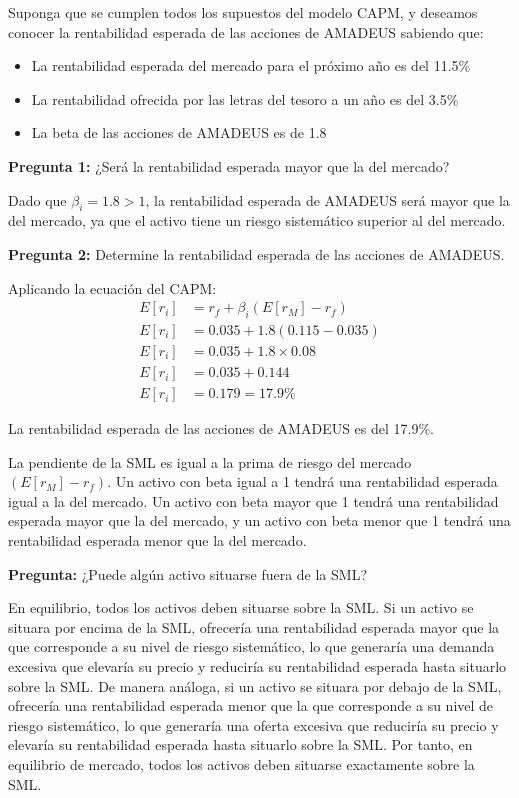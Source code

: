 \begin{ejemplo}
Suponga que se cumplen todos los supuestos del modelo CAPM, y deseamos conocer la rentabilidad esperada de las acciones de AMADEUS sabiendo que:
\begin{itemize}
\item La rentabilidad esperada del mercado para el próximo año es del 11.5\%
\item La rentabilidad ofrecida por las letras del tesoro a un año es del 3.5\%
\item La beta de las acciones de AMADEUS es de 1.8
\end{itemize}

\textbf{Pregunta 1:} ¿Será la rentabilidad esperada mayor que la del mercado?

Dado que $\beta_i = 1.8 > 1$, la rentabilidad esperada de AMADEUS será mayor que la del mercado, ya que el activo tiene un riesgo sistemático superior al del mercado.

\textbf{Pregunta 2:} Determine la rentabilidad esperada de las acciones de AMADEUS.

Aplicando la ecuación del CAPM:
\begin{align}
E[r_i] &= r_f + \beta_i(E[r_M] - r_f) \\
E[r_i] &= 0.035 + 1.8(0.115 - 0.035) \\
E[r_i] &= 0.035 + 1.8 \times 0.08 \\
E[r_i] &= 0.035 + 0.144 \\
E[r_i] &= 0.179 = 17.9\%
\end{align}

La rentabilidad esperada de las acciones de AMADEUS es del 17.9\%.
\end{ejemplo}

La pendiente de la SML es igual a la prima de riesgo del mercado $(E[r_M] - r_f)$. Un activo con beta igual a 1 tendrá una rentabilidad esperada igual a la del mercado. Un activo con beta mayor que 1 tendrá una rentabilidad esperada mayor que la del mercado, y un activo con beta menor que 1 tendrá una rentabilidad esperada menor que la del mercado.

\textbf{Pregunta:} ¿Puede algún activo situarse fuera de la SML?

En equilibrio, todos los activos deben situarse sobre la SML. Si un activo se situara por encima de la SML, ofrecería una rentabilidad esperada mayor que la que corresponde a su nivel de riesgo sistemático, lo que generaría una demanda excesiva que elevaría su precio y reduciría su rentabilidad esperada hasta situarlo sobre la SML. De manera análoga, si un activo se situara por debajo de la SML, ofrecería una rentabilidad esperada menor que la que corresponde a su nivel de riesgo sistemático, lo que generaría una oferta excesiva que reduciría su precio y elevaría su rentabilidad esperada hasta situarlo sobre la SML. Por tanto, en equilibrio de mercado, todos los activos deben situarse exactamente sobre la SML.

